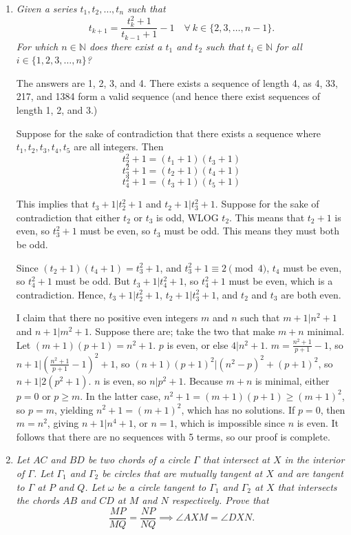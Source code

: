 \documentclass{article}
\begin{document}
\begin{enumerate}
\medskip
\item %
{\itshape Given a series $t_1, t_2, \dotsc, t_n$ such that 
\[ t_{k + 1} = \frac{t_k^2 + 1}{t_{k-1} + 1} - 1 \quad \forall \ k \in \{2, 3, \dots, n-1\}. \]
For which $n \in \mathbb{N}$ does there exist a $t_1$ and $t_2$ such that $t_i \in \mathbb{N}$ for all $i \in \{1, 2, 3, \dotsc, n\}$?}

The answers are 1, 2, 3, and 4. There exists a sequence of length 4, as 4, 33, 217, and 1384 form a valid sequence (and hence there exist sequences of length 1, 2, and 3.)

Suppose for the sake of contradiction that there exists a sequence where $t_1, t_2, t_3, t_4, t_5$ are all integers. Then $$t_2^2 + 1 = (t_1 + 1)(t_3 + 1)$$ 
$$t_3^2 + 1 = (t_2 + 1)(t_4 + 1)$$
$$t_4^2 + 1 = (t_3 + 1)(t_5 + 1)$$

This implies that $t_3 + 1 | t_2^2 + 1$ and $t_2 + 1 | t_3^2 + 1$. Suppose for the sake of contradiction that either $t_2$ or $t_3$ is odd, WLOG $t_2$. This means that $t_2 + 1$ is even, so $t_3^2 + 1$ must be even, so $t_3$ must be odd. This means they must both be odd. 

Since $(t_2 + 1)(t_4 + 1) = t_3^2 + 1$, and $t_3^2 + 1 \equiv 2 \pmod{4}$, $t_4$ must be even, so $t_4^2 + 1$ must be odd. But $t_3 + 1 | t_4^2 + 1$, so $t_4^2 + 1$ must be even, which is a contradiction. Hence, $t_3 + 1 | t_2^2 + 1$, $t_2 + 1 | t_3^2 + 1$, and $t_2$ and $t_3$ are both even.

I claim that there no positive even integers $m$ and $n$ such that $m+1 | n^2 + 1$ and $n+1 | m^2 + 1$. Suppose there are; take the two that make $m + n$ minimal. Let $(m+1)(p+1) = n^2 + 1$. $p$ is even, or else $4 | n^2 + 1$. $m = \frac{n^2+1}{p+1} - 1$, so $n + 1 | \left(\frac{n^2+1}{p+1} - 1\right)^2 + 1$, so $(n+1)(p+1)^2 | (n^2 - p)^2 + (p+1)^2$, so $n+1 | 2(p^2+1)$. $n$ is even, so $n | p^2 + 1$. Because $m+n$ is minimal, either $p=0$ or $p \geq m$. In the latter case, $n^2 + 1 = (m+1)(p+1) \geq (m+1)^2$, so $p = m$, yielding $n^2 + 1 = (m+1)^2$, which has no solutions. If $p=0$, then $m = n^2$, giving $n+1 | n^4 + 1$, or $n=1$, which is impossible since $n$ is even. It follows that there are no sequences with 5 terms, so our proof is complete.



\medskip
\item %
{\itshape Let $AC$ and $BD$ be two chords of a circle $\Gamma$ that intersect at $X$ in the interior of $\Gamma$.
Let $\Gamma_1$ and $\Gamma_2$ be circles that are mutually tangent at $X$ and are tangent to $\Gamma$ at $P$ and $Q$.
Let $\omega$ be a circle tangent to $\Gamma_1$ and $\Gamma_2$ at $X$ that intersects the chords $AB$ and $CD$ at $M$ and $N$ respectively.
Prove that
\[
	\frac{MP}{MQ} = \frac{NP}{NQ} \implies \angle AXM = \angle DXN.
\]}




\end{enumerate}
\end{document}
